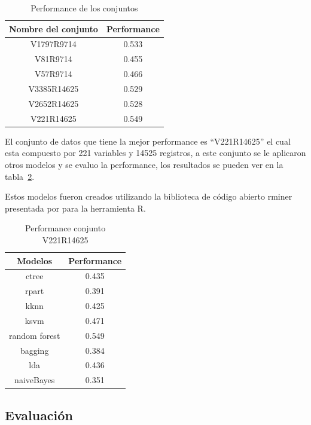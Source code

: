 \begin{table}
\begin{center}
\caption{Performance de los conjuntos}
\label{table:performance}
\begin{tabular}{|c|c|}
\hline
  \rowcolor{blue!55} 
   Nombre del conjunto & Performance \\ \hline
   V1797R9714 & 0.533 \\ \hline
   V81R9714 & 0.455 \\ \hline
   V57R9714 & 0.466 \\ \hline
   V3385R14625 & 0.529 \\ \hline
   V2652R14625 & 0.528 \\ \hline
   V221R14625 & 0.549 \\ \hline
    \end{tabular}
\end{center}
\end{table}

El conjunto de datos que tiene la mejor performance es ``V221R14625'' el cual esta compuesto
por 221 variables y 14525 registros, a este conjunto se le aplicaron otros modelos y se evaluo la performance, los 
resultados se pueden ver en la tabla~\ref{table:performanceV221R14625}.

Estos modelos fueron creados utilizando la biblioteca de código abierto rminer presentada por \cite{cortez2010data} para la
herramienta R.

\begin{table}
\begin{center}
\caption{Performance conjunto V221R14625}
\label{table:performanceV221R14625}
\begin{tabular}{|c|c|}
\hline
  \rowcolor{blue!55} 
   Modelos & Performance \\ \hline
   ctree & 0.435 \\ \hline
   rpart & 0.391 \\ \hline
   kknn & 0.425 \\ \hline
   ksvm & 0.471 \\ \hline
   random forest & 0.549 \\ \hline
   bagging & 0.384 \\ \hline
   lda & 0.436 \\ \hline
   naiveBayes & 0.351 \\ \hline
 \end{tabular}
\end{center}
\end{table}

\subsection{Evaluación} 

